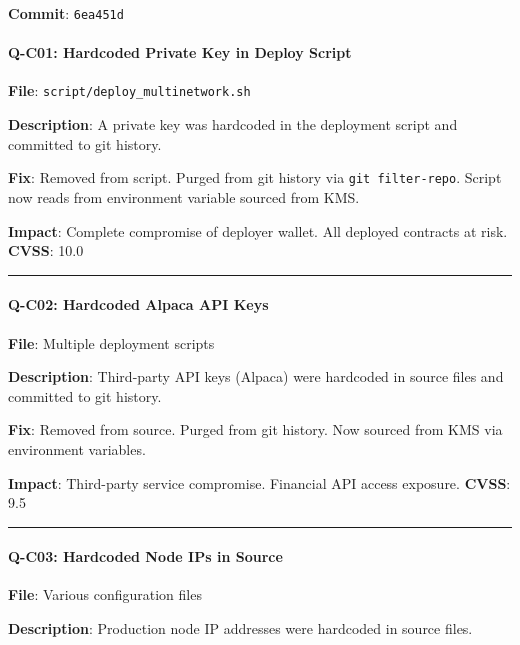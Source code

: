 \documentclass[
]{article}
\begin{document}
\textbf{Commit}: \texttt{6ea451d}

\paragraph{Q-C01: Hardcoded Private Key in Deploy
Script}\label{q-c01-hardcoded-private-key-in-deploy-script}

\textbf{File}: \texttt{script/deploy\_multinetwork.sh}

\textbf{Description}: A private key was hardcoded in the deployment
script and committed to git history.

\textbf{Fix}: Removed from script. Purged from git history via
\texttt{git\ filter-repo}. Script now reads from environment variable
sourced from KMS.

\textbf{Impact}: Complete compromise of deployer wallet. All deployed
contracts at risk. \textbf{CVSS}: 10.0

\begin{center}\rule{0.5\linewidth}{0.5pt}\end{center}

\paragraph{Q-C02: Hardcoded Alpaca API
Keys}\label{q-c02-hardcoded-alpaca-api-keys}

\textbf{File}: Multiple deployment scripts

\textbf{Description}: Third-party API keys (Alpaca) were hardcoded in
source files and committed to git history.

\textbf{Fix}: Removed from source. Purged from git history. Now sourced
from KMS via environment variables.

\textbf{Impact}: Third-party service compromise. Financial API access
exposure. \textbf{CVSS}: 9.5

\begin{center}\rule{0.5\linewidth}{0.5pt}\end{center}

\paragraph{Q-C03: Hardcoded Node IPs in
Source}\label{q-c03-hardcoded-node-ips-in-source}

\textbf{File}: Various configuration files

\textbf{Description}: Production node IP addresses were hardcoded in
source files.
\end{document}
